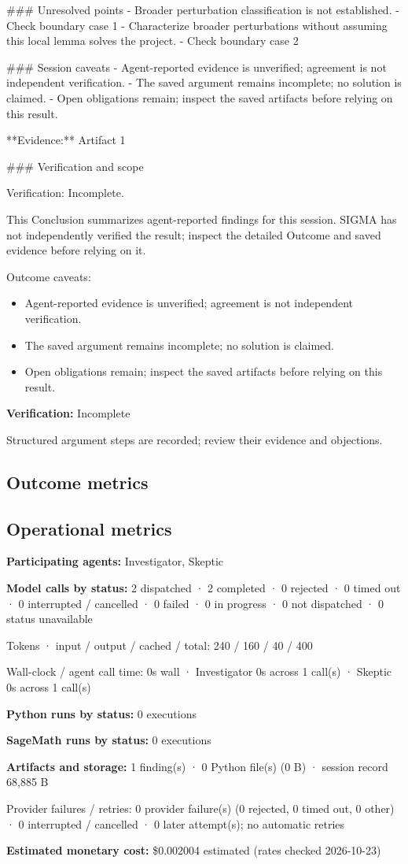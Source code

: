 \documentclass[11pt]{article}
\begin{document}
\#\#\# Unresolved points
- Broader perturbation classification is not established.
- Check boundary case 1
- Characterize broader perturbations without assuming this local lemma solves the project.
- Check boundary case 2

\#\#\# Session caveats
- Agent-reported evidence is unverified; agreement is not independent verification.
- The saved argument remains incomplete; no solution is claimed.
- Open obligations remain; inspect the saved artifacts before relying on this result.

**Evidence:** Artifact 1

\#\#\# Verification and scope

Verification: Incomplete.

This Conclusion summarizes agent-reported findings for this session. SIGMA has not independently verified the result; inspect the detailed Outcome and saved evidence before relying on it.\par
Outcome caveats:\par
\begin{itemize}
\item Agent-reported evidence is unverified; agreement is not independent verification.
\item The saved argument remains incomplete; no solution is claimed.
\item Open obligations remain; inspect the saved artifacts before relying on this result.
\end{itemize}
\textbf{Verification:} Incomplete\par
Structured argument steps are recorded; review their evidence and objections.\par
\subsection{Outcome metrics}
\subsection{Operational metrics}
\textbf{Participating agents:} Investigator, Skeptic\par
\textbf{Model calls by status:} 2 dispatched · 2 completed · 0 rejected · 0 timed out · 0 interrupted / cancelled · 0 failed · 0 in progress · 0 not dispatched · 0 status unavailable\par
Tokens · input / output / cached / total: 240 / 160 / 40 / 400\par
Wall-clock / agent call time: 0s wall · Investigator 0s across 1 call(s) · Skeptic 0s across 1 call(s)\par
\textbf{Python runs by status:} 0 executions\par
\textbf{SageMath runs by status:} 0 executions\par
\textbf{Artifacts and storage:} 1 finding(s) · 0 Python file(s) (0 B) · session record 68,885 B\par
Provider failures / retries: 0 provider failure(s) (0 rejected, 0 timed out, 0 other) · 0 interrupted / cancelled · 0 later attempt(s); no automatic retries\par
\textbf{Estimated monetary cost:} \$0.002004 estimated (rates checked 2026-10-23)\par
\end{document}
